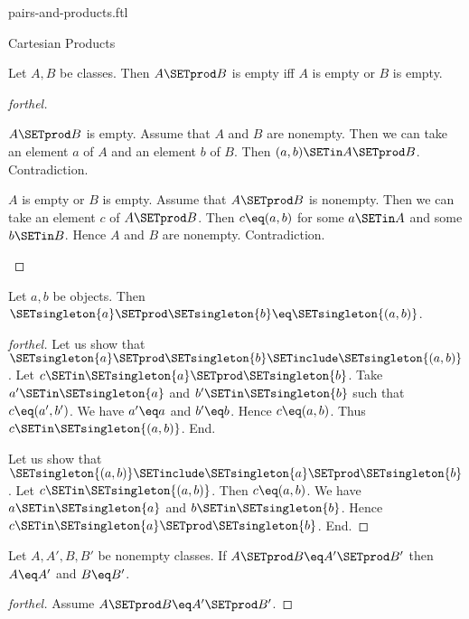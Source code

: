 \documentclass{stex}
\begin{document}
\begin{smodule}{pairs-and-products.ftl}
\begin{sfragment}{Cartesian Products}
  \begin{proposition}[forthel,id=FOUNDATIONS_04_2198552029691904]
    Let $A, B$ be classes.
    Then $A \SETprod B$ is empty iff $A$ is empty or $B$ is empty.
  \end{proposition}
  \begin{proof}[forthel]
    \begin{case}{$A \SETprod B$ is empty.}
      Assume that $A$ and $B$ are nonempty.
      Then we can take an element $a$ of $A$ and an element $b$ of $B$.
      Then $(a, b) \SETin A \SETprod B$.
      Contradiction.
    \end{case}

    \begin{case}{$A$ is empty or $B$ is empty.}
      Assume that $A \SETprod B$ is nonempty.
      Then we can take an element $c$ of $A \SETprod B$.
      Then $c \eq (a, b)$ for some $a \SETin A$ and some $b \SETin B$.
      Hence $A$ and $B$ are nonempty.
      Contradiction.
    \end{case}
  \end{proof}

  \begin{proposition}[forthel,id=FOUNDATIONS_04_7971087096741888]
    Let $a, b$ be objects.
    Then $\SETsingleton{a} \SETprod \SETsingleton{b} \eq \SETsingleton{(a, b)}$.
  \end{proposition}
  \begin{proof}[forthel]
    Let us show that $\SETsingleton{a} \SETprod \SETsingleton{b} \SETinclude \SETsingleton{(a, b)}$.
      Let $c \SETin \SETsingleton{a} \SETprod \SETsingleton{b}$.
      Take $a' \SETin \SETsingleton{a}$ and $b' \SETin \SETsingleton{b}$ such that $c \eq (a', b')$.
      We have $a' \eq a$ and $b' \eq b$.
      Hence $c \eq (a, b)$.
      Thus $c \SETin \SETsingleton{(a, b)}$.
    End.

    Let us show that $\SETsingleton{(a, b)} \SETinclude \SETsingleton{a} \SETprod \SETsingleton{b}$.
      Let $c \SETin \SETsingleton{(a, b)}$.
      Then $c \eq (a, b)$.
      We have $a \SETin \SETsingleton{a}$ and $b \SETin \SETsingleton{b}$.
      Hence $c \SETin \SETsingleton{a} \SETprod \SETsingleton{b}$.
    End.
  \end{proof}

  \begin{proposition}[forthel,id=FOUNDATIONS_04_7456594440749056]
    Let $A, A', B, B'$ be nonempty classes.
    If $A \SETprod B \eq A' \SETprod B'$ then $A \eq A'$ and $B \eq B'$.
  \end{proposition}
  \begin{proof}[forthel]
    Assume $A \SETprod B \eq A' \SETprod B'$.


\end{proof}
\end{sfragment}
\end{smodule}
\end{document}
